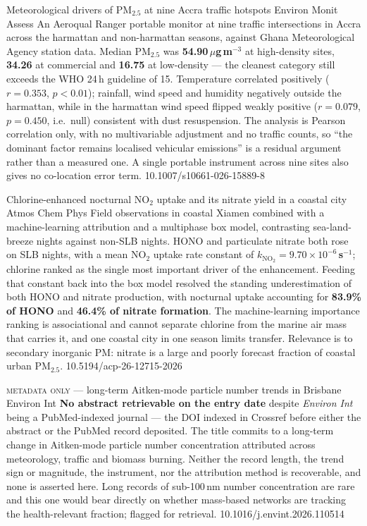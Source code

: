 \documentclass[10pt]{article}
\begin{document}

{Meteorological drivers of PM$_{2.5}$ at nine Accra traffic hotspots}
{Environ Monit Assess}
{An Aeroqual Ranger portable monitor at nine traffic intersections in Accra across the
harmattan and non-harmattan seasons, against Ghana Meteorological Agency station data. Median
PM$_{2.5}$ was \textbf{54.90\,$\mu$g\,m$^{-3}$} at high-density sites, \textbf{34.26} at
commercial and \textbf{16.75} at low-density --- the cleanest category still exceeds the WHO
24\,h guideline of 15. Temperature correlated positively ($r=0.353$, $p<0.01$); rainfall,
wind speed and humidity negatively outside the harmattan, while in the harmattan wind speed
flipped weakly positive ($r=0.079$, $p=0.450$, i.e.\ null) consistent with dust resuspension.
The analysis is Pearson correlation only, with no multivariable adjustment and no traffic
counts, so ``the dominant factor remains localised vehicular emissions'' is a residual
argument rather than a measured one. A single portable instrument across nine sites also
gives no co-location error term.}
{10.1007/s10661-026-15889-8}

{Chlorine-enhanced nocturnal NO$_2$ uptake and its nitrate yield in a coastal city}
{Atmos Chem Phys}
{Field observations in coastal Xiamen combined with a machine-learning attribution and a
multiphase box model, contrasting sea-land-breeze nights against non-SLB nights. HONO and
particulate nitrate both rose on SLB nights, with a mean NO$_2$ uptake rate constant of
\textbf{$k_{\mathrm{NO_2}}=9.70\times10^{-6}$\,s$^{-1}$}; chlorine ranked as the single most
important driver of the enhancement. Feeding that constant back into the box model resolved
the standing underestimation of both HONO and nitrate production, with nocturnal uptake
accounting for \textbf{83.9\% of HONO} and \textbf{46.4\% of nitrate formation}. The
machine-learning importance ranking is associational and cannot separate chlorine from the
marine air mass that carries it, and one coastal city in one season limits transfer.
Relevance is to secondary inorganic PM: nitrate is a large and poorly forecast fraction of
coastal urban PM$_{2.5}$.}
{10.5194/acp-26-12715-2026}

{\textsc{metadata only} --- long-term Aitken-mode particle number trends in Brisbane}
{Environ Int}
{\textbf{No abstract retrievable on the entry date} despite \textit{Environ Int} being a
PubMed-indexed journal --- the DOI indexed in Crossref before either the abstract or the
PubMed record deposited. The title commits to a long-term change in Aitken-mode particle
number concentration attributed across meteorology, traffic and biomass burning. Neither the
record length, the trend sign or magnitude, the instrument, nor the attribution method is
recoverable, and none is asserted here. Long records of sub-100\,nm number concentration are
rare and this one would bear directly on whether mass-based networks are tracking the
health-relevant fraction; flagged for retrieval.}
{10.1016/j.envint.2026.110514}
\end{document}
